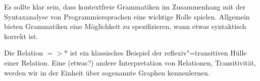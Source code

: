 Es sollte klar sein, dass kontextfreie Grammatiken im Zusammenhang mit
der Syntaxanalyse von Programmiersprachen eine wichtige Rolle spielen.
Allgemein bieten Grammatiken eine Möglichkeit zu spezifizieren, wann
etwas syntaktisch korrekt ist.

Die Relation $=>*$ ist ein klassisches Beispiel der
reflexiv"=transitiven Hülle einer Relation. Eine (etwas?) andere
Interpretation von Relationen, Transitivität, \usw werden wir in der
Einheit über sogenannte Graphen kennenlernen.

\cleardoublepage

